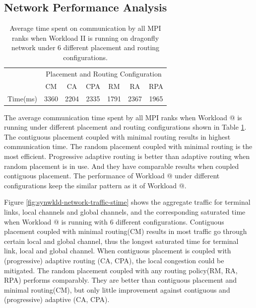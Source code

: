 \documentclass[conference,compsoc]{IEEEtran}
\makeatletter
\newcommand{\Rmnum}[1]{\expandafter\@slowromancap\romannumeral #1@}
\makeatother
\begin{document}
\subsection{Network Performance Analysis}
\label{sec: workload-2 network analysis}

\begin{table}[ht]
\begin{center}
\caption{Average time spent on communication by all MPI ranks when Workload II is running on dragonfly network under 6 different placement and routing configurations.} 
\label{tab:syn-wkld-commtime}
\begin{tabular}{l c c c c c c }
\toprule %
\toprule
&\multicolumn{6}{c}{Placement and Routing Configuration} \\ %
\cmidrule(l){2-7}
	      & CM & CA & CPA & RM & RA & RPA \\ %
\midrule %
Time(ms)  & 3360 & 2204 & 2335 & 1791 & 2367 & 1965 \\ %

\midrule %
\bottomrule %
\end{tabular}
\end{center}
\end{table}


The average communication time spent by all MPI ranks when Workload \Rmnum{2} is running under different placement and routing configurations shown in Table \ref{tab:syn-wkld-commtime}. The contiguous placement coupled with minimal routing results in highest communication time. The random placement coupled with minimal routing is the most efficient. Progressive adaptive routing is better than adaptive routing when random placement is in use. And they have comparable results when coupled contiguous placement. The performance of Workload \Rmnum{2} under different configurations keep the similar pattern as it of Workload \Rmnum{1}. 


Figure \ref{fig:synwkld-network-traffic-stime} shows the aggregate traffic for terminal links, local channels and global channels, and the corresponding saturated time when Workload \Rmnum{2} is running with 6 different configurations. Contiguous placement coupled with minimal routing(CM) results in most traffic go through certain local and global channel, thus the longest saturated time for terminal link, local and global channel. When contiguous placement is coupled with (progressive) adaptive routing (CA, CPA), the local congestion could be mitigated. The random placement coupled with any routing policy(RM, RA, RPA) performs comparably. They are better than contiguous placement and minimal routing(CM), but only little improvement against contiguous and (progressive) adaptive (CA, CPA).
\end{document}
